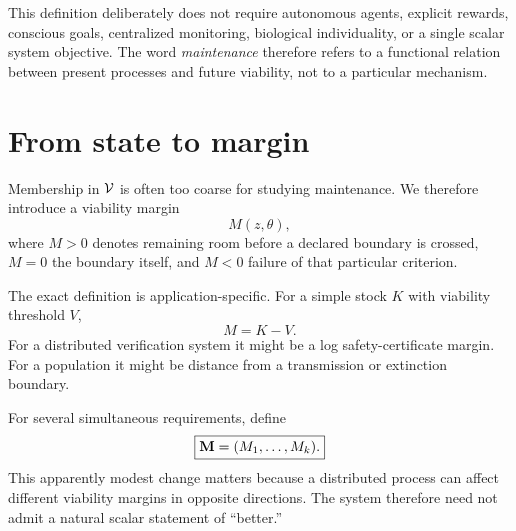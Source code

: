 This definition deliberately does not require autonomous agents, explicit rewards, conscious goals, centralized monitoring, biological individuality, or a single scalar system objective. The word \emph{maintenance} therefore refers to a functional relation between present processes and future viability, not to a particular mechanism.

\section{From state to margin}

Membership in \(\mathcal V\) is often too coarse for studying maintenance. We therefore introduce a viability margin
\[
M(z,\theta),
\]
where \(M>0\) denotes remaining room before a declared boundary is crossed, \(M=0\) the boundary itself, and \(M<0\) failure of that particular criterion.

The exact definition is application-specific. For a simple stock \(K\) with viability threshold \(V\),
\[
M=K-V.
\]
For a distributed verification system it might be a log safety-certificate margin. For a population it might be distance from a transmission or extinction boundary.

For several simultaneous requirements, define
\[
\boxed{
\mathbf M=(M_1,\ldots,M_k).
}
\]
This apparently modest change matters because a distributed process can affect different viability margins in opposite directions. The system therefore need not admit a natural scalar statement of ``better.''
